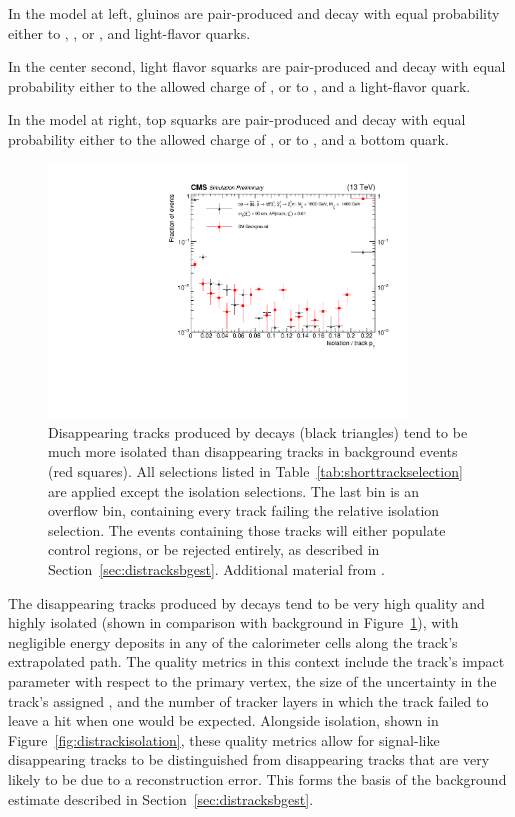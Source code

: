   In the model at left, gluinos are pair-produced and decay with equal probability either to \chip, \chim, or \lsp, and light-flavor quarks.

  In the center second, light flavor squarks are pair-produced and decay with equal probability either to the allowed charge of \chargino, or to \lsp, and a light-flavor quark.

  In the model at right, top squarks are pair-produced and decay with equal probability either to the allowed charge of \chargino, or to \lsp, and a bottom quark.

  \begin{figure}[h!]
    \centering
    \includegraphics[width=0.85\textwidth]{figures/reliso_SvsB.pdf}
    \caption[Comparison of signal and background Short Track relative isolation distributions.]
            {Disappearing tracks produced by \chargino decays (black triangles) tend to be much more isolated than disappearing tracks in background events (red squares).
              All selections listed in Table~\ref{tab:shorttrackselection} are applied except the isolation selections.
              The last bin is an overflow bin, containing every track failing the relative isolation selection.
              The events containing those tracks will either populate control regions, or be rejected entirely, as described in Section~\ref{sec:distracksbgest}.
              Additional material from \cite{MT2_2019}.}
            \label{fig:distracksisolation}
  \end{figure}  

  The disappearing tracks produced by \chargino decays tend to be very high quality and highly isolated (shown in comparison with background in Figure~\ref{fig:distracksisolation}), with negligible energy deposits in any of the calorimeter cells along the track's extrapolated path.
  The quality metrics in this context include the track's impact parameter with respect to the primary vertex, the size of the uncertainty in the track's assigned \pt, and the number of tracker layers in which the track failed to leave a hit when one would be expected.
  Alongside isolation, shown in Figure~\ref{fig:distrackisolation}, these quality metrics allow for signal-like disappearing tracks to be distinguished from disappearing tracks that are very likely to be due to a reconstruction error.
  This forms the basis of the background estimate described in Section~\ref{sec:distracksbgest}.

